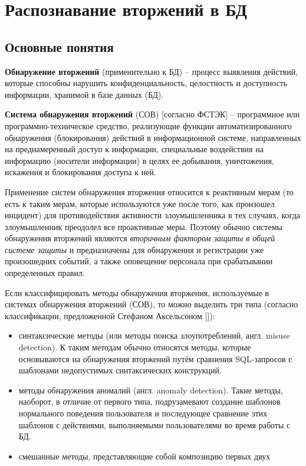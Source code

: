 
\section{Распознавание вторжений в БД}



\subsection{Основные понятия}

\textbf{Обнаружение вторжений} (применительно к БД) -- процесс выявления действий, 
которые способны нарушить конфиденциальность, целостность и доступность информации, 
хранимой в базе данных (БД).

\textbf{Система обнаружения вторжений} (СОВ) [согласно ФСТЭК] -- программное или 
программно-техническое средство, реализующие функции автоматизированного обнаружения 
(блокирования) действий в информационной системе, направленных на преднамеренный доступ 
к информации, специальные воздействия на информацию (носители информации) в целях ее 
добывания, уничтожения, искажения и блокирования доступа к ней.

Применение систем обнаружения вторжения относится к реактивным мерам (то есть к таким 
мерам, которые используются уже после того, как произошел инцидент) для противодействия 
активности злоумышленника в тех случаях, когда злоумышленник преодолел все проактивные 
меры. Поэтому обычно системы обнаружения вторжений являются \textit{вторичным фактором 
защиты в общей системе защиты} и предназначены для обнаружения и регистрации уже 
произошедних событий, а также оповещение персонала при срабатывании определенных правил.

Если классифицировать методы обнаружения вторжения, используемые в системах обнаружения 
вторжений (СОВ), то можно выделить три типа (согласно классификации, предложенной 
Стефаном Аксельсоном [\cite{IDSClassification}]):
\begin{itemize}
	\item синтаксические методы (или методы поиска злоупотреблений, англ. misuse detection).
		К таким методам обычно относятся методы, которые основываются на обнаружения 
		вторжений путём сравнения SQL-запросов с шаблонами недопустимых синтаксических 
		конструкций.

	\item методы обнаружения аномалий (англ. anomaly detection).
		Такие методы, наоборот, в отличие от первого типа, подрузамевают создание шаблонов 
		нормального поведения пользователя и последующее сравнение этих шаблонов с действиями, 
		выполняемыми пользователями во время работы с БД.

	\item смешанные методы, представляющие собой композицию первых двух
\end{itemize}



